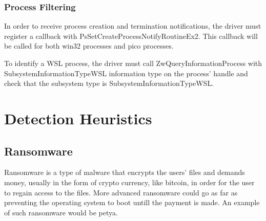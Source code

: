 \documentclass[conference]{IEEEtran}
\begin{document}
    \subsubsection{Process Filtering}
    In order to receive process creation and termination notifications, the driver must register a callback with
    PsSetCreateProcessNotifyRoutineEx2. This callback will be called for both win32 processes and pico processes.\\
    
    \par{}
    To identify a WSL process, the driver must call ZwQueryInformationProcess with SubsystemInformationTypeWSL information type on the
    process' handle and check that the subsystem type is SubsystemInformationTypeWSL.\\






\section{Detection Heuristics}
    \subsection{Ransomware}
    Ransomware is a type of malware that encrypts the users' files and demands money, usually in the form of crypto currency, like bitcoin,
    in order for the user to regain access to the files. More advanced ransomware could go as far as preventing the operating system to boot
    untill the payment is made. An example of such ransomware would be petya.\\
\end{document}
